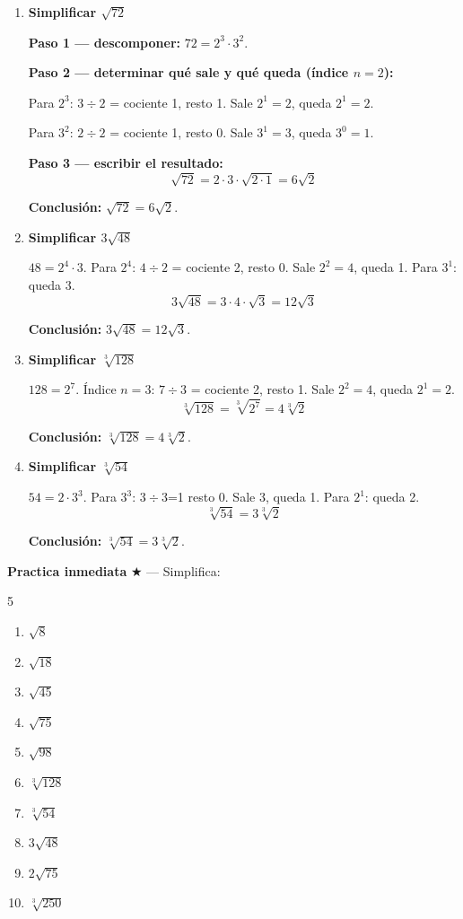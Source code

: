 \documentclass[11pt, letterpaper]{article}
\begin{document}
\begin{tcolorbox}[examplebox, title={Ejemplos — simplificación}]
\begin{enumerate}[label=\textbf{Ej. \arabic*.}, leftmargin=*, itemsep=14pt]

\item \textbf{Simplificar $\sqrt{72}$}

\textbf{Paso 1 — descomponer:} $72 = 2^3 \cdot 3^2$.

\textbf{Paso 2 — determinar qué sale y qué queda (índice $n=2$):}

Para $2^3$: $3\div 2$ = cociente 1, resto 1. Sale $2^1=2$, queda $2^1=2$.

Para $3^2$: $2\div 2$ = cociente 1, resto 0. Sale $3^1=3$, queda $3^0=1$.

\textbf{Paso 3 — escribir el resultado:}
$$\sqrt{72} = 2\cdot 3\cdot\sqrt{2\cdot 1} = 6\sqrt{2}$$

\textbf{Conclusión:} $\sqrt{72}=6\sqrt{2}$.

\item \textbf{Simplificar $3\sqrt{48}$}

$48=2^4\cdot 3$. Para $2^4$: $4\div 2$ = cociente 2, resto 0. Sale $2^2=4$, queda 1. Para $3^1$: queda $3$.
$$3\sqrt{48}=3\cdot 4\cdot\sqrt{3}=12\sqrt{3}$$

\textbf{Conclusión:} $3\sqrt{48}=12\sqrt{3}$.

\item \textbf{Simplificar $\sqrt[3]{128}$}

$128 = 2^7$. Índice $n=3$: $7\div 3$ = cociente 2, resto 1. Sale $2^2=4$, queda $2^1=2$.
$$\sqrt[3]{128}=\sqrt[3]{2^7}=4\sqrt[3]{2}$$

\textbf{Conclusión:} $\sqrt[3]{128}=4\sqrt[3]{2}$.

\item \textbf{Simplificar $\sqrt[3]{54}$}

$54=2\cdot 3^3$. Para $3^3$: $3\div 3$=1 resto 0. Sale 3, queda 1. Para $2^1$: queda 2.
$$\sqrt[3]{54}=3\sqrt[3]{2}$$

\textbf{Conclusión:} $\sqrt[3]{54}=3\sqrt[3]{2}$.

\end{enumerate}
\end{tcolorbox}

\medskip
\textbf{Practica inmediata} \quad $\bigstar$ — Simplifica:
\begin{multicols}{5}
\begin{enumerate}[label=\alph*), leftmargin=*]
  \item $\sqrt{8}$
  \item $\sqrt{18}$
  \item $\sqrt{45}$
  \item $\sqrt{75}$
  \item $\sqrt{98}$
  \item $\sqrt[3]{128}$
  \item $\sqrt[3]{54}$
  \item $3\sqrt{48}$
  \item $2\sqrt{75}$
  \item $\sqrt[3]{250}$
\end{enumerate}
\end{multicols}
\end{document}
